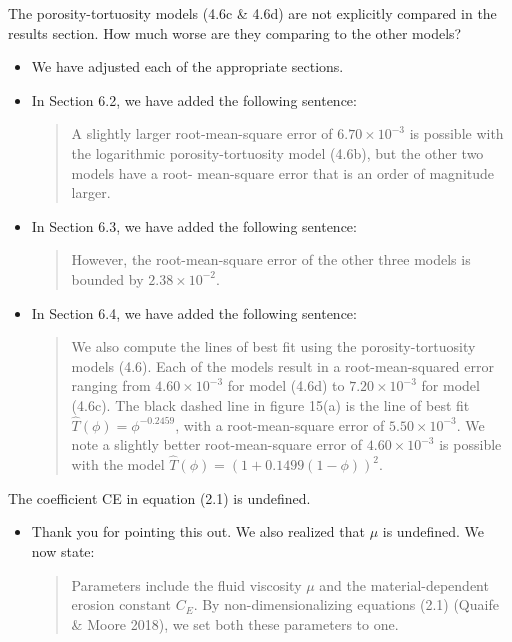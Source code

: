 \documentclass[11pt]{article}
\newcommand{\comment}[1]{{\color{blue} #1}}
\begin{document}
\noindent
\comment{The porosity-tortuosity models (4.6c \& 4.6d) are not
explicitly compared in the results section. How much worse are they
comparing to the other models?}
\begin{itemize}
  \item We have adjusted each of the appropriate sections.

  \item In Section 6.2, we have added the following sentence:
    \begin{quotation}
      \noindent
      A slightly larger root-mean-square error of $6.70 \times 10^{-3}$
      is possible with the logarithmic porosity-tortuosity model (4.6b),
      but the other two models have a root- mean-square error that is an
      order of magnitude larger.
    \end{quotation}


  \item In Section 6.3, we have added the following sentence:
    \begin{quotation}
      \noindent
      However, the root-mean-square error of the other three models is
      bounded by $2.38 \times 10^{-2}$.
    \end{quotation}

  \item In Section 6.4, we have added the following sentence:
    \begin{quotation}
      \noindent
      We also compute the lines of best fit using the
      porosity-tortuosity models (4.6).  Each of the models result in a
      root-mean-squared error ranging from $4.60 \times 10^{-3}$ for
      model (4.6d) to $7.20 \times 10^{-3}$ for model (4.6c). The black
      dashed line in figure 15(a) is the line of best fit
      $\widehat{T}(\phi) = \phi^{-0.2459}$, with a root-mean-square
      error of $5.50 \times 10^{-3}$.  We note a slightly better
      root-mean-square error of $4.60 \times 10^{-3}$ is possible with
      the model $\widehat{T}(\phi) = \left(1 + 0.1499(1-\phi)\right)^2$.
    \end{quotation}

\end{itemize}

\noindent
\comment{The coefficient CE in equation (2.1) is undefined.}
\begin{itemize}
  \item Thank you for pointing this out. We also realized that $\mu$ is
  undefined. We now state:
  \begin{quotation}
    \noindent
    Parameters include the fluid viscosity $\mu$ and the
    material-dependent erosion constant $C_E$. By non-dimensionalizing
    equations (2.1) (Quaife \& Moore 2018), we set both these parameters
    to one.
  \end{quotation}
\end{itemize}
\end{document}
